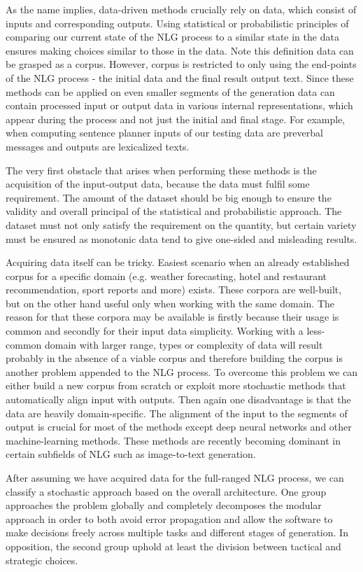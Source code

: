 As the name implies, data-driven methods crucially rely on data, which consist of inputs and corresponding outputs. Using statistical or probabilistic principles of comparing our current state of the NLG process to a similar state in the data ensures making choices similar to those in the data. Note this definition data can be grasped as a corpus. However, corpus is restricted to only using the end-points of the NLG process - the initial data and the final result output text. Since these methods can be applied on even smaller segments of the generation data can contain processed input or output data in various internal representations, which appear during the process and not just the initial and final stage. For example, when computing sentence planner inputs of our testing data are preverbal messages and outputs are lexicalized texts.

The very first obstacle that arises when performing these methods is the acquisition of the input-output data, because the data must fulfil some requirement. The amount of the dataset should be big enough to ensure the validity and overall principal of the statistical and probabilistic approach. The dataset must not only satisfy the requirement on the quantity, but certain variety must be ensured as monotonic data tend to give one-sided and misleading results. 

Acquiring data itself can be tricky. Easiest scenario when an already established corpus for a specific domain (e.g. weather forecasting, hotel and restaurant recommendation, sport reports and more) exists. These corpora are well-built, but on the other hand useful only when working with the same domain. The reason for that these corpora may be available is firstly because their usage is common and secondly for their input data simplicity. Working with a less-common domain with larger range, types or complexity of data will result probably in the absence of a viable corpus and therefore building the corpus is another problem appended to the NLG process. To overcome this problem we can either build a new corpus from scratch or exploit more stochastic methods that automatically align input with outputs. Then again one disadvantage is that the data are heavily domain-specific. The alignment of the input to the segments of output is crucial for most of the methods except deep neural networks and other machine-learning methods. These methods are recently becoming dominant in certain subfields of NLG such as image-to-text generation.

After assuming we have acquired data for the full-ranged NLG process, we can classify a stochastic approach based on the overall architecture. One group approaches the problem globally and completely decomposes the modular approach in order to both avoid error propagation and allow the software to make decisions freely across multiple tasks and different stages of generation. In opposition, the second group uphold at least the division between tactical and strategic choices.  

